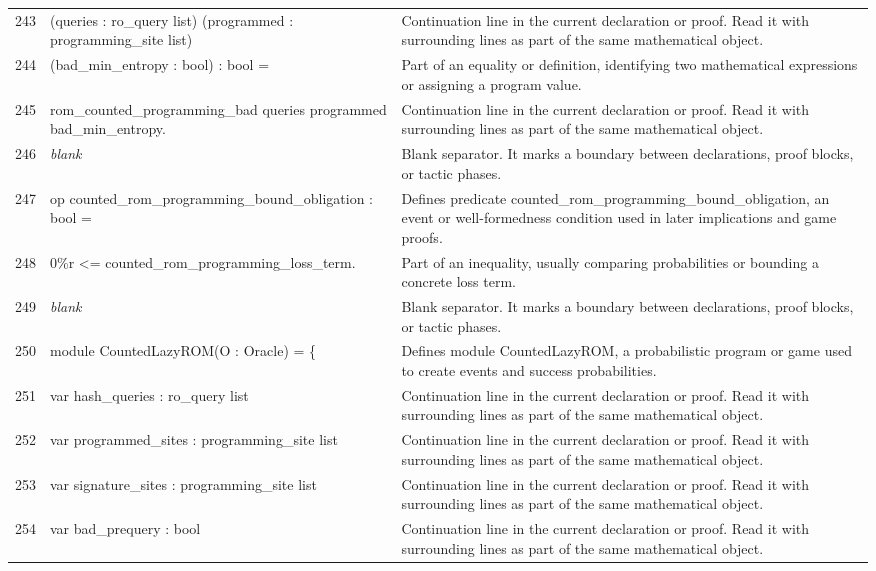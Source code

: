 \documentclass[10pt]{article}
\begin{document}
\begin{longtable}{r L{0.53\textwidth} L{0.37\textwidth}}
243 & {\ttfamily\scriptsize    (queries : ro\_query list) (programmed : programming\_site list)} & Continuation line in the current declaration or proof.  Read it with surrounding lines as part of the same mathematical object. \\
244 & {\ttfamily\scriptsize    (bad\_min\_entropy : bool) : bool =} & Part of an equality or definition, identifying two mathematical expressions or assigning a program value. \\
245 & {\ttfamily\scriptsize   rom\_counted\_programming\_bad queries programmed bad\_min\_entropy.} & Continuation line in the current declaration or proof.  Read it with surrounding lines as part of the same mathematical object. \\
246 & {\ttfamily\scriptsize \emph{blank}} & Blank separator.  It marks a boundary between declarations, proof blocks, or tactic phases. \\
247 & {\ttfamily\scriptsize op counted\_rom\_programming\_bound\_obligation : bool =} & Defines predicate counted\_rom\_programming\_bound\_obligation, an event or well-formedness condition used in later implications and game proofs. \\
248 & {\ttfamily\scriptsize   0\%r <= counted\_rom\_programming\_loss\_term.} & Part of an inequality, usually comparing probabilities or bounding a concrete loss term. \\
249 & {\ttfamily\scriptsize \emph{blank}} & Blank separator.  It marks a boundary between declarations, proof blocks, or tactic phases. \\
250 & {\ttfamily\scriptsize module CountedLazyROM(O : Oracle) = \{} & Defines module CountedLazyROM, a probabilistic program or game used to create events and success probabilities. \\
251 & {\ttfamily\scriptsize   var hash\_queries : ro\_query list} & Continuation line in the current declaration or proof.  Read it with surrounding lines as part of the same mathematical object. \\
252 & {\ttfamily\scriptsize   var programmed\_sites : programming\_site list} & Continuation line in the current declaration or proof.  Read it with surrounding lines as part of the same mathematical object. \\
253 & {\ttfamily\scriptsize   var signature\_sites : programming\_site list} & Continuation line in the current declaration or proof.  Read it with surrounding lines as part of the same mathematical object. \\
254 & {\ttfamily\scriptsize   var bad\_prequery : bool} & Continuation line in the current declaration or proof.  Read it with surrounding lines as part of the same mathematical object. \\

\end{longtable}
\end{document}
